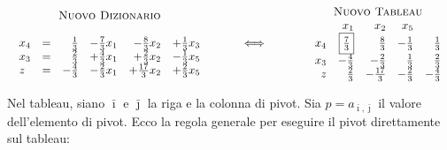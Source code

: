 \documentclass[10pt]{article}
\begin{document}
\[
   \begin{array}{c}
   \mbox{\sc Nuovo Dizionario}\\ \\
   \begin{array}{lcrrrr}
      x_{4} &=& \frac{1}{3} & -\frac{7}{3}x_1 & -\frac{8}{3}x_2 & +\frac{1}{3}x_3 \\
      x_{3} &=& \frac{2}{3} & +\frac{4}{3}x_1 & +\frac{2}{3}x_2 & -\frac{1}{3}x_5 \\
         z    &=& -\frac{4}{3} & -\frac{2}{3}x_1 & +\frac{17}{3}x_2 & +\frac{2}{3}x_5 \\
   \end{array}
   \end{array}
\hfill
\hspace{1cm}
{\Huge \Longleftrightarrow}
\hfill
\hspace{1.2cm}
   \begin{array}{c}
   \mbox{\sc Nuovo Tableau}\\ 
   \begin{array}{rrrrr}
         & x_1  & x_2 & x_5  \\
      x_4 &  \fbox{$\frac{7}{3}$} &  \frac{8}{3} & -\frac{1}{3}   &  \frac{1}{3} \\
      x_3 & -\frac{4}{3} &  -\frac{2}{3}  &  \frac{1}{3}  &  \frac{2}{3} \\
       z  &  \frac{2}{3} &  -\frac{17}{3} & -\frac{2}{3}  & -\frac{4}{3} \\
   \end{array}
   \end{array}
\]

Nel tableau, siano $\bar{\imath}$ e $\bar{\jmath}$
la riga e la colonna di pivot.
Sia $p= a_{\bar{\imath},\bar{\jmath}}$ il valore dell'elemento di pivot.
Ecco la regola generale per
eseguire il pivot direttamente sul tableau:
\end{document}

